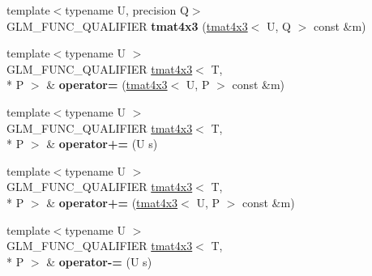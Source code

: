 \begin{DoxyCompactItemize}
\item 
\hypertarget{structglm_1_1detail_1_1tmat4x3_a52fb0f3d88fbe4449d065ac3c9dc0984}{{\footnotesize template$<$typename U, precision Q$>$ }\\G\-L\-M\-\_\-\-F\-U\-N\-C\-\_\-\-Q\-U\-A\-L\-I\-F\-I\-E\-R {\bfseries tmat4x3} (\hyperlink{structglm_1_1detail_1_1tmat4x3}{tmat4x3}$<$ U, Q $>$ const \&m)}\label{structglm_1_1detail_1_1tmat4x3_a52fb0f3d88fbe4449d065ac3c9dc0984}

\item 
\hypertarget{structglm_1_1detail_1_1tmat4x3_a887443085fbd9cd29710306c99edede2}{{\footnotesize template$<$typename U $>$ }\\G\-L\-M\-\_\-\-F\-U\-N\-C\-\_\-\-Q\-U\-A\-L\-I\-F\-I\-E\-R \hyperlink{structglm_1_1detail_1_1tmat4x3}{tmat4x3}$<$ T, \\*
P $>$ \& {\bfseries operator=} (\hyperlink{structglm_1_1detail_1_1tmat4x3}{tmat4x3}$<$ U, P $>$ const \&m)}\label{structglm_1_1detail_1_1tmat4x3_a887443085fbd9cd29710306c99edede2}

\item 
\hypertarget{structglm_1_1detail_1_1tmat4x3_a4ad2b7cf1ca8473d377b1a6bfbdb7f53}{{\footnotesize template$<$typename U $>$ }\\G\-L\-M\-\_\-\-F\-U\-N\-C\-\_\-\-Q\-U\-A\-L\-I\-F\-I\-E\-R \hyperlink{structglm_1_1detail_1_1tmat4x3}{tmat4x3}$<$ T, \\*
P $>$ \& {\bfseries operator+=} (U s)}\label{structglm_1_1detail_1_1tmat4x3_a4ad2b7cf1ca8473d377b1a6bfbdb7f53}

\item 
\hypertarget{structglm_1_1detail_1_1tmat4x3_af8c2c8f9977ae873d3c26b5027363fcf}{{\footnotesize template$<$typename U $>$ }\\G\-L\-M\-\_\-\-F\-U\-N\-C\-\_\-\-Q\-U\-A\-L\-I\-F\-I\-E\-R \hyperlink{structglm_1_1detail_1_1tmat4x3}{tmat4x3}$<$ T, \\*
P $>$ \& {\bfseries operator+=} (\hyperlink{structglm_1_1detail_1_1tmat4x3}{tmat4x3}$<$ U, P $>$ const \&m)}\label{structglm_1_1detail_1_1tmat4x3_af8c2c8f9977ae873d3c26b5027363fcf}

\item 
\hypertarget{structglm_1_1detail_1_1tmat4x3_af3a1782be12d9d822cc6fc21b94fe319}{{\footnotesize template$<$typename U $>$ }\\G\-L\-M\-\_\-\-F\-U\-N\-C\-\_\-\-Q\-U\-A\-L\-I\-F\-I\-E\-R \hyperlink{structglm_1_1detail_1_1tmat4x3}{tmat4x3}$<$ T, \\*
P $>$ \& {\bfseries operator-\/=} (U s)}\label{structglm_1_1detail_1_1tmat4x3_af3a1782be12d9d822cc6fc21b94fe319}


\end{DoxyCompactItemize}
